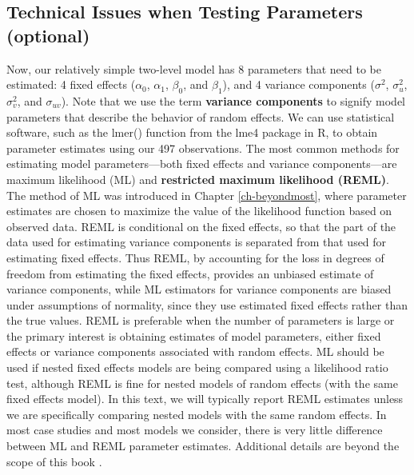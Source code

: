 \documentclass[
]{krantz}
\begin{document}
\subsection{Technical Issues when Testing Parameters (optional)}\label{multileveltechnical}

Now, our relatively simple two-level model has 8 parameters that need to be estimated: 4 fixed effects (\(\alpha_{0}\), \(\alpha_{1}\), \(\beta_{0}\), and \(\beta_{1}\)), and 4 variance components (\(\sigma^{2}\), \(\sigma_{u}^{2}\), \(\sigma_{v}^{2}\), and \(\sigma_{uv}\)). Note that we use the term \textbf{variance components}  to signify model parameters that describe the behavior of random effects. We can use statistical software, such as the lmer() function from the lme4 package in R, to obtain parameter estimates using our 497 observations. The most common methods for estimating model parameters---both fixed effects and variance components---are maximum likelihood (ML) and \textbf{restricted maximum likelihood (REML)}.  The method of ML was introduced in Chapter \ref{ch-beyondmost}, where parameter estimates are chosen to maximize the value of the likelihood function based on observed data. REML is conditional on the fixed effects, so that the part of the data used for estimating variance components is separated from that used for estimating fixed effects. Thus REML, by accounting for the loss in degrees of freedom from estimating the fixed effects, provides an unbiased estimate of variance components, while ML estimators for variance components are biased under assumptions of normality, since they use estimated fixed effects rather than the true values. REML is preferable when the number of parameters is large or the primary interest is obtaining estimates of model parameters, either fixed effects or variance components associated with random effects. ML should be used if nested fixed effects models are being compared using a likelihood ratio test, although REML is fine for nested models of random effects (with the same fixed effects model). In this text, we will typically report REML estimates unless we are specifically comparing nested models with the same random effects. In most case studies and most models we consider, there is very little difference between ML and REML parameter estimates. Additional details are beyond the scope of this book \citep{Singer2003}.
\end{document}
